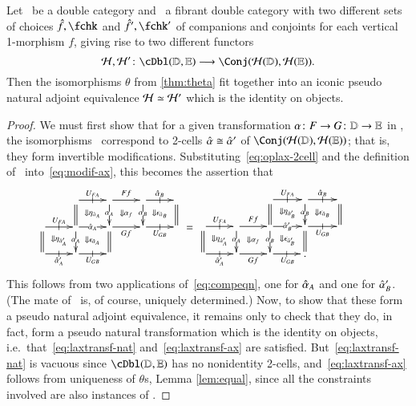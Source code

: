 \begin{lem}\label{thm:h-locfr-uniq}
  Let \lD\ be a double category and \lE\ a fibrant double category
  with two different sets of choices $\fhat,\fchk$ and $\fhat',\fchk'$
  of companions and conjoints for each vertical 1-morphism $f$, giving
  rise to two different functors
  \[\cH,\cH'\maps \cDbl(\lD,\lE)\too \Conj(\cH(\lD),\cH(\lE)).\]
  Then the isomorphisms $\theta$ from \autoref{thm:theta} fit together
  into an iconic pseudo natural adjoint equivalence $\mathcal{H}\simeq \mathcal{H}'$ which is the
  identity on objects.
\end{lem}
\begin{proof}
  We must first show that for a given transformation $\alpha\colon F\to
  G\colon \mathbb{D}\to\mathbb{E}$ in \cDbl, the isomorphisms \th\ correspond to 2-cells $\hat{\alpha} \cong \hat{\alpha}'$ of $\Conj(\cH(\lD),\cH(\lE))$; that is, they form invertible
  modifications.
  Substituting~\eqref{eq:oplax-2cell} and the definition of \th\
  into~\eqref{eq:modif-ax}, this becomes the assertion that
  \begin{equation}
    \vcenter{\xymatrix@R=1.5pc@C=2pc{
        &
        \ar[r]|-@{|}^{U_{FA}}\ar@{=}[d] \ar@{}[dr]|{\Downarrow \eta_{\hat{\alpha}_A}} &
        \ar[r]^{Ff}\ar[d]|{\al_A} \ar@{}[dr]|{\Downarrow \al_f} &
        \ar[r]|-@{|}^{\alhat_B}\ar[d]|{\al_B} \ar@{}[dr]|{\Downarrow \epsilon_{\hat{\alpha}_B}} &
        \ar@{=}[d]\\
        \ar[r]|-@{|}^{U_{FA}} \ar@{=}[d] \ar@{}[dr]|{\Downarrow \eta_{\hat{\alpha}_A'}} &
        \ar[r]|{\alhat_A} \ar[d]|{\al_A} \ar@{}[dr]|{\Downarrow \epsilon_{\hat{\alpha}_A}}&
        \ar[r]_{Gf}  \ar@{=}[d] &
        \ar[r]|-@{|}_{U_{GB}} & \\
        \ar[r]|-@{|}_{\alhat_A'} & \ar[r]|-@{|}_{U_{GB}}&&
      }} \;=\;
    \vcenter{\xymatrix@R=1.5pc@C=2pc{
        && \ar@{=}[d] \ar[r]|-@{|}^{U_{FA}} \ar@{}[dr]|{\Downarrow \eta_{\hat{\alpha}_B'}} &
        \ar[d]|{\al_B} \ar[r]|-@{|}^{\alhat_B} \ar@{}[dr]|{\Downarrow \epsilon_{\hat{\alpha}_B}}
        &
        \ar@{=}[d] &\\
        \ar[r]|-@{|}^{U_{FA}}\ar@{=}[d] \ar@{}[dr]|{\Downarrow \eta_{\hat{\alpha}_A'}} &
        \ar[r]^{Ff}\ar[d]|{\al_A} \ar@{}[dr]|{\Downarrow \al_f} &
        \ar[r]|{\alhat_B'}\ar[d]|{\al_B} \ar@{}[dr]|{\Downarrow \epsilon_{\hat{\alpha}_B'}} &
        \ar@{=}[d] \ar[r]|-@{|}_{U_{GB}}&\\
        \ar[r]|-@{|}_{\alhat_A'} &
        \ar[r]_{Gf} &
        \ar[r]|-@{|}_{U_{GB}} & .
      }}
  \end{equation}
  This follows from two applications of~\eqref{eq:compeqn}, one for
  $\hat{\alpha}_A$ and one for $\hat{\alpha}_B'$.  (The mate of \th\ is, of
  course, uniquely determined.)  Now, to show that these form a pseudo
  natural adjoint equivalence, it remains only to check that they do,
  in fact, form a pseudo natural transformation which is the identity
  on objects, i.e.\ that~\eqref{eq:laxtransf-nat}
  and~\eqref{eq:laxtransf-ax} are satisfied.
  But~\eqref{eq:laxtransf-nat} is vacuous since $\cDbl(\lD,\lE)$ has
  no nonidentity 2-cells, and~\eqref{eq:laxtransf-ax} follows from uniqueness of $\theta$s,
  Lemma \ref{lem:equal}, since all the constraints involved are
  also instances of \th.
\end{proof}
